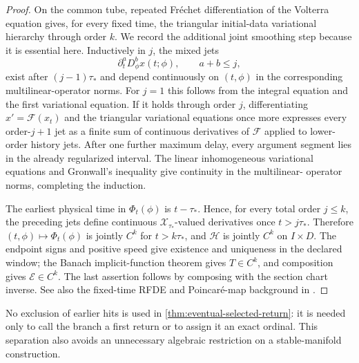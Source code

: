\begin{proof}
On the common tube, repeated Fr\'echet differentiation of the Volterra
equation gives, for every fixed time, the triangular initial-data
variational hierarchy through order \(k\).  We record the additional joint
smoothing step because it is essential here.  Inductively in \(j\), the
mixed jets
\[
 \partial_t^aD_\phi^b x(t;\phi),
 \qquad a+b\le j,
\]
exist after \((j-1)\tau_*\) and depend continuously on \((t,\phi)\) in the
corresponding multilinear-operator norms.  For \(j=1\) this follows from the
integral equation and the first variational equation.  If it holds through
order \(j\), differentiating \(x'=\mathcal F(x_t)\) and the triangular
variational equations once more expresses every order-\(j+1\) jet as a
finite sum of continuous derivatives of \(\mathcal F\) applied to lower-order
history jets.  After one further maximum delay, every argument segment lies
in the already regularized interval.  The linear inhomogeneous variational
equations and Gronwall's inequality give continuity in the multilinear-
operator norms, completing the induction.

The earliest physical time in \(\Phi_t(\phi)\) is \(t-\tau_*\).  Hence, for
every total order \(j\le k\), the preceding jets define continuous
\(\mathcal X_{\tau_*}\)-valued derivatives once \(t>j\tau_*\).  Therefore
\((t,\phi)\mapsto\Phi_t(\phi)\) is jointly \(C^k\) for \(t>k\tau_*\), and
\(\mathcal H\) is jointly \(C^k\) on \(I\times D\).  The endpoint signs and
positive speed give existence and uniqueness in the declared window; the
Banach implicit-function theorem gives \(T\in C^k\), and composition gives
\(\mathcal E\in C^k\).  The last assertion follows by composing with the
section chart inverse.  See also the fixed-time RFDE and Poincar\'e-map
background in \citet[Chs.~VII.4 and XIV.3]{diekmann1995delay}.
\end{proof}

No exclusion of earlier hits is used in
\cref{thm:eventual-selected-return}: it is needed only to call the branch a
first return or to assign it an exact ordinal.  This separation also avoids
an unnecessary algebraic restriction on a stable-manifold construction.

